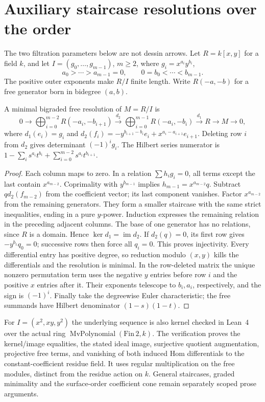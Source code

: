 \section{Auxiliary staircase resolutions over the order}
The two filtration parameters below are not dessin arrows. Let $R=k[x,y]$
for a field $k$, and let $I=(g_0,\ldots,g_{m-1})$, $m\ge2$, where
$g_i=x^{a_i}y^{b_i}$,
\[
 a_0>\cdots>a_{m-1}=0,\qquad 0=b_0<\cdots<b_{m-1}.
\]
The positive outer exponents make $R/I$ finite length. Write $R(-a,-b)$
for a free generator born in bidegree $(a,b)$.
\begin{proposition}\label{thm:staircase}
A minimal bigraded free resolution of $M=R/I$ is
\[
0\longrightarrow\bigoplus_{i=0}^{m-2}R(-a_i,-b_{i+1})
\xrightarrow{d_2}\bigoplus_{i=0}^{m-1}R(-a_i,-b_i)
\xrightarrow{d_1}R\longrightarrow M\longrightarrow0,
\]
where $d_1(e_i)=g_i$ and
$d_2(f_i)=-y^{b_{i+1}-b_i}e_i+x^{a_i-a_{i+1}}e_{i+1}$.
Deleting row $i$ from $d_2$ gives determinant $(-1)^ig_i$.
The Hilbert series numerator is
$1-\sum_i s^{a_i}t^{b_i}+\sum_{i=0}^{m-2}s^{a_i}t^{b_{i+1}}$.
\end{proposition}
\begin{proof}
Each column maps to zero. In a relation $\sum h_i g_i=0$, all terms except
the last contain $x^{a_{m-2}}$. Coprimality with $y^{b_{m-1}}$ implies
$h_{m-1}=x^{a_{m-2}}q$. Subtract $q d_2(f_{m-2})$ from the coefficient
vector; its last component vanishes. Factor $x^{a_{m-2}}$ from the remaining
generators. They form a smaller staircase with the same strict inequalities,
ending in a pure $y$-power. Induction expresses the remaining relation in
the preceding adjacent columns. The base of one generator has no relations,
since $R$ is a domain. Hence $\ker d_1=\operatorname{im}d_2$.
If $d_2(q)=0$, its first row gives $-y^{b_1}q_0=0$; successive rows then
force all $q_i=0$. This proves injectivity. Every differential entry has
positive degree, so reduction modulo $(x,y)$ kills the differentials and
the resolution is minimal. In the row-deleted matrix the unique nonzero
permutation term uses the negative $y$ entries before row $i$ and the
positive $x$ entries after it. Their exponents telescope to $b_i,a_i$,
respectively, and the sign is $(-1)^i$. Finally take the degreewise Euler
characteristic; the free summands have Hilbert denominator $(1-s)(1-t)$.
\end{proof}
For $I=(x^2,xy,y^2)$ the underlying sequence is also kernel checked
in Lean~4 over the actual ring $\operatorname{MvPolynomial}(\mathrm{Fin}\,2,k)$.
The verification proves the kernel/image equalities, the stated ideal image,
surjective quotient augmentation, projective free terms, and vanishing of
both induced Hom differentials to the constant-coefficient residue field.
It uses regular multiplication on the free modules, distinct from the
residue action on $k$. General staircases, graded minimality and the
surface-order coefficient cone remain separately scoped prose arguments.

